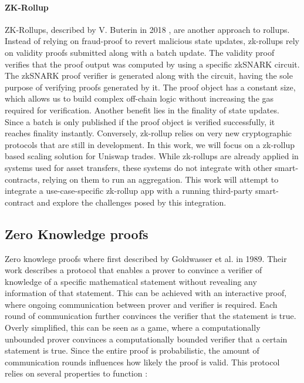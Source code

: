 \documentclass[../../thesis.tex]{subfiles}
\begin{document}
\paragraph{ZK-Rollup}
ZK-Rollups, described by V. Buterin in 2018 \cite{vbuterin2018zkrollup}, are another approach to rollups. Instead of relying on fraud-proof to revert malicious state updates, zk-rollups rely on validity proofs submitted along with a batch update. The validity proof verifies that the proof output was computed by using a specific zkSNARK circuit. The zkSNARK proof verifier is generated along with the circuit, having the sole purpose of verifying proofs generated by it. The proof object has a constant size, which allows us to build complex off-chain logic without increasing the gas required for verification. Another benefit lies in the finality of state updates. Since a batch is only published if the proof object is verified successfully, it reaches finality instantly.
Conversely, zk-rollup relies on very new cryptographic protocols that are still in development. In this work, we will focus on a zk-rollup based scaling solution for Uniswap trades. While zk-rollups are already applied in systems used for asset transfers, these systems do not integrate with other smart-contracts, relying on them to run an aggregation. This work will attempt to integrate a use-case-specific zk-rollup app with a running third-party smart-contract and explore the challenges posed by this integration. 


\subsection{Zero Knowledge proofs}
Zero knowlege proofs where first described by Goldwasser et al. \cite{goldwasser1989knowledge} in 1989. Their work describes a protocol that enables a prover to convince a verifier of knowledge of a specific mathematical statement without revealing any information of that statement. This can be achieved with an interactive proof, where ongoing communication between prover and verifier is required. Each round of communication further convinces the verifier that the statement is true. Overly simplified, this can be seen as a game, where a computationally unbounded prover convinces a computationally bounded verifier that a certain statement is true. Since the entire proof is probabilistic, the amount of communication rounds influences how likely the proof is valid. This protocol relies on several properties to function \cite{goldreich1994definitions}:
\end{document}
